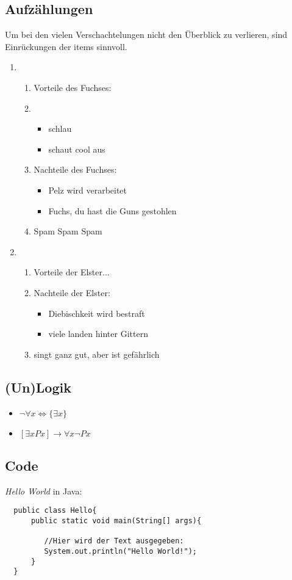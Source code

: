 \documentclass[a4paper, pdftex, ngerman, 11pt]{article}
\begin{document}
\subsection{Aufzählungen}
Um bei den vielen Verschachtelungen nicht den Überblick zu verlieren, sind Einrückungen der items sinnvoll.
\begin{enumerate}
	\item 
	\begin{enumerate}
		\item Vorteile des Fuchses:
		\item
		\begin{itemize}
			\item schlau
			\item schaut cool aus
		\end{itemize}
		\item Nachteile des Fuchses:
		\begin{itemize}
			\item Pelz wird verarbeitet
			\item Fuchs, du hast die Guns gestohlen
		\end{itemize}
		\item Spam Spam Spam
	\end{enumerate}
	
	\item
	\begin{enumerate}
		\item Vorteile der Elster...
		\item Nachteile der Elster:
		\begin{itemize}
			\item Diebischkeit wird bestraft
			\item viele landen hinter Gittern
		\end{itemize}
		\item singt ganz gut, aber ist gefährlich
	\end{enumerate}
\end{enumerate}

\subsection{(Un)Logik}
\begin{itemize}
	\item $\lnot\forall x \Leftrightarrow \{\exists x\}$
	\item $[\exists xPx] \rightarrow \forall x \lnot Px$
\end{itemize}

\subsection{Code}
\textit{Hello World} in Java:\\

\begin{lstlisting}
  public class Hello{
      public static void main(String[] args){
      
         //Hier wird der Text ausgegeben:
         System.out.println("Hello World!");
      }
  }
\end{lstlisting}
\end{document}

